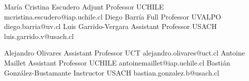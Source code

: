 





\begin{referees}
		{María Cristina Escudero}
		{Adjunt Professor}
		{UCHILE}
		{mcristina.escudero@iap.uchile.cl}
		{Diego Barría}
		{Full Professor}
		{UVALPO}
		{diego.barria@uv.cl}
		{Luis Garrido-Vergara}
		{Assistant Professor}
		{USACH}
		{luis.garrido.v@usach.cl}
\end{referees}

\begin{referees}
		{Alejandro Olivares}
		{Assistant Professor}
		{UCT}
		{alejandro.olivares@uct.cl}
		{Antoine Maillet}
		{Assistant Professor}
		{UCHILE}
		{antoinemaillet@iap.uchile.cl}
		{Bastián González-Bustamante}
		{Instructor}
		{USACH}
		{bastian.gonzalez.b@usach.cl}
\end{referees}

